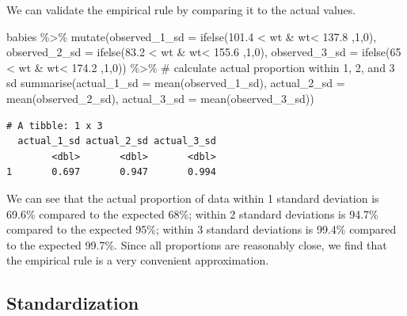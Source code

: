 \documentclass[
  letterpaper,
  DIV=11,
  numbers=noendperiod]{scrreprt}
\newenvironment{Shaded}{\begin{snugshade}}{\end{snugshade}}
\newcommand{\AttributeTok}[1]{\textcolor[rgb]{0.40,0.45,0.13}{#1}}
\newcommand{\CommentTok}[1]{\textcolor[rgb]{0.37,0.37,0.37}{#1}}
\newcommand{\DecValTok}[1]{\textcolor[rgb]{0.68,0.00,0.00}{#1}}
\newcommand{\FloatTok}[1]{\textcolor[rgb]{0.68,0.00,0.00}{#1}}
\newcommand{\FunctionTok}[1]{\textcolor[rgb]{0.28,0.35,0.67}{#1}}
\newcommand{\NormalTok}[1]{\textcolor[rgb]{0.00,0.23,0.31}{#1}}
\newcommand{\SpecialCharTok}[1]{\textcolor[rgb]{0.37,0.37,0.37}{#1}}
\theoremstyle{definition}
\theoremstyle{remark}
\begin{document}
We can validate the empirical rule by comparing it to the actual values.

\begin{Shaded}
\begin{Highlighting}[]
\NormalTok{babies }\SpecialCharTok{\%\textgreater{}\%} 
  \FunctionTok{mutate}\NormalTok{(}\AttributeTok{observed\_1\_sd =} \FunctionTok{ifelse}\NormalTok{(}\FloatTok{101.4} \SpecialCharTok{\textless{}}\NormalTok{ wt }\SpecialCharTok{\&}\NormalTok{ wt}\SpecialCharTok{\textless{}} \FloatTok{137.8}\NormalTok{ ,}\DecValTok{1}\NormalTok{,}\DecValTok{0}\NormalTok{),}
         \AttributeTok{observed\_2\_sd =} \FunctionTok{ifelse}\NormalTok{(}\FloatTok{83.2} \SpecialCharTok{\textless{}}\NormalTok{ wt }\SpecialCharTok{\&}\NormalTok{ wt}\SpecialCharTok{\textless{}} \FloatTok{155.6}\NormalTok{ ,}\DecValTok{1}\NormalTok{,}\DecValTok{0}\NormalTok{),}
         \AttributeTok{observed\_3\_sd =} \FunctionTok{ifelse}\NormalTok{(}\DecValTok{65} \SpecialCharTok{\textless{}}\NormalTok{ wt }\SpecialCharTok{\&}\NormalTok{ wt}\SpecialCharTok{\textless{}} \FloatTok{174.2}\NormalTok{ ,}\DecValTok{1}\NormalTok{,}\DecValTok{0}\NormalTok{)) }\SpecialCharTok{\%\textgreater{}\%} 
  \CommentTok{\# calculate actual proportion within 1, 2, and 3 sd}
  \FunctionTok{summarise}\NormalTok{(}\AttributeTok{actual\_1\_sd =} \FunctionTok{mean}\NormalTok{(observed\_1\_sd),}
            \AttributeTok{actual\_2\_sd =} \FunctionTok{mean}\NormalTok{(observed\_2\_sd),}
            \AttributeTok{actual\_3\_sd =} \FunctionTok{mean}\NormalTok{(observed\_3\_sd))}
\end{Highlighting}
\end{Shaded}

\begin{verbatim}
# A tibble: 1 x 3
  actual_1_sd actual_2_sd actual_3_sd
        <dbl>       <dbl>       <dbl>
1       0.697       0.947       0.994
\end{verbatim}

We can see that the actual proportion of data within 1 standard
deviation is 69.6\% compared to the expected 68\%; within 2 standard
deviations is 94.7\% compared to the expected 95\%; within 3 standard
deviations is 99.4\% compared to the expected 99.7\%. Since all
proportions are reasonably close, we find that the empirical rule is a
very convenient approximation.

\hypertarget{standardization}{%
\subsection{Standardization}\label{standardization}}
\end{document}
